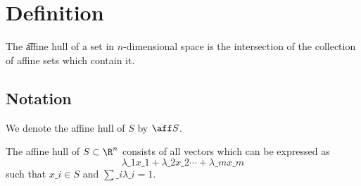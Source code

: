 
\section*{Definition}

The \t{affine hull} of a set in $n$-dimensional space is the intersection of the collection of affine sets which contain it.

\subsection*{Notation}

We denote the affine hull of $S$ by $\aff S$.

\begin{proposition}The affine hull of $S \subset \R ^n$ consists of all vectors which can be expressed as
\[
\lambda \_1 x\_1 + \lambda \_2 x\_2 \cdots + \lambda \_m x\_m
\]
such that $x\_i \in S$ and $\sum\_i \lambda \_i = 1$.\end{proposition}
\blankpage